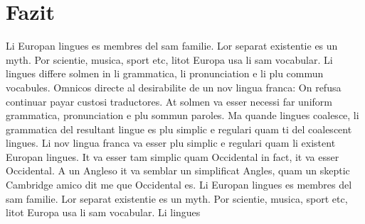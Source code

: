 \chapter{Fazit}

Li Europan lingues es membres del sam familie. Lor separat existentie es un myth. Por scientie, musica, sport etc, litot Europa usa li sam vocabular. Li lingues differe solmen in li grammatica, li pronunciation e li plu commun vocabules. Omnicos directe al desirabilite de un nov lingua franca: On refusa continuar payar custosi traductores. At solmen va esser necessi far uniform grammatica, pronunciation e plu sommun paroles. Ma quande lingues coalesce, li grammatica del resultant lingue es plu simplic e regulari quam ti del coalescent lingues. Li nov lingua franca va esser plu simplic e regulari quam li existent Europan lingues. It va esser tam simplic quam Occidental in fact, it va esser Occidental. A un Angleso it va semblar un simplificat Angles, quam un skeptic Cambridge amico dit me que Occidental es. Li Europan lingues es membres del sam familie. Lor separat existentie es un myth. Por scientie, musica, sport etc, litot Europa usa li sam vocabular. Li lingues 